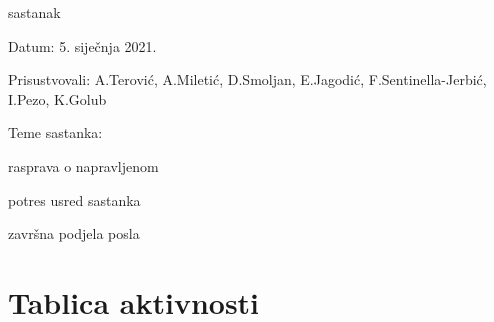 \begin{packed_enum}
	\item  sastanak
	\item[] \begin{packed_item}
		\item Datum: 5. siječnja 2021.
		\item Prisustvovali: A.Terović, A.Miletić, D.Smoljan, E.Jagodić, F.Sentinella-Jerbić, I.Pezo, K.Golub
		\item Teme sastanka:
		\begin{packed_item}
			\item rasprava o napravljenom
			\item potres usred sastanka
			\item završna podjela posla
		\end{packed_item}
	\end{packed_item}
	
	
\end{packed_enum}

\eject
\section*{Tablica aktivnosti}



